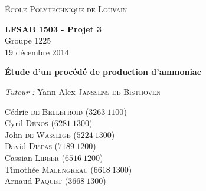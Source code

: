 \begin{titlepage}
    \begin{center}
        \vspace*{1cm}
        
        \Large
	\textsc{École Polytechnique de Louvain} \\
        \vspace{1cm}
	
	\textbf{LFSAB 1503 - Projet 3} \\  

	\large
        Groupe 1225 \\
	19 décembre 2014	
        
        \vspace{3cm}
        
        \Huge
	\textbf{Étude d'un procédé de production d'ammoniac}
        \vspace{0,5cm}
        
        

        \vfill 
        \large

	\begin{flushright}

	\textit{Tuteur : } Yann-Alex \textsc{Janssens de Bisthoven} \vspace{1\baselineskip}

	Cédric \textsc{de Bellefroid}  ($3263~1100$) \\
	Cyril \textsc{Dénos}  ($6281~1300$) \\
	John \textsc{de Wasseige}  ($5224~1300$) \\
	David \textsc{Dispas}  ($7189~1200$) \\
	Cassian \textsc{Libeer}   ($6516~1200$) \\
	Timothée \textsc{Malengreau}  ($6618~1300$) \\
	Arnaud \textsc{Paquet}  ($3668~1300$) \\       
	\end{flushright}
        
    \end{center}
\end{titlepage}
